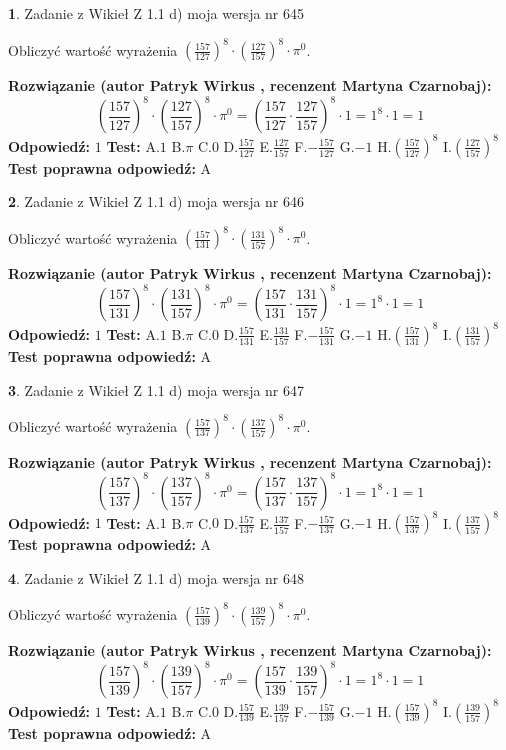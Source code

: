 \documentclass[12pt, a4paper]{article}
\theoremstyle{definition} %
\newtheorem{zad}{}
\newcommand{\zadStart}[1]{\begin{zad}#1\newline}
\newcommand{\zadStop}{\end{zad}}
\newcommand{\rozwStart}[2]{\noindent \textbf{Rozwiązanie (autor #1 , recenzent #2): }\newline}
\newcommand{\rozwStop}{\newline}
\newcommand{\odpStart}{\noindent \textbf{Odpowiedź:}\newline}
\newcommand{\odpStop}{\newline}
\newcommand{\testStart}{\noindent \textbf{Test:}\newline}
\newcommand{\testStop}{\newline}
\newcommand{\kluczStart}{\noindent \textbf{Test poprawna odpowiedź:}\newline}
\newcommand{\kluczStop}{\newline}
\begin{document}
\zadStart{Zadanie z Wikieł Z 1.1 d) moja wersja nr 645}

Obliczyć wartość wyrażenia $(\frac{157}{127})^{8} \cdot (\frac{127}{157})^{8} \cdot \pi^{0}$.
\zadStop
\rozwStart{Patryk Wirkus}{Martyna Czarnobaj}
$$(\frac{157}{127})^{8} \cdot (\frac{127}{157})^{8} \cdot \pi^{0} = (\frac{157}{127} \cdot \frac{127}{157})^{8} \cdot 1 = 1^{8} \cdot 1 = 1$$
\rozwStop
\odpStart
$1$
\odpStop
\testStart
A.$1$ B.$\pi$ C.$0$ D.$\frac{157}{127}$ E.$\frac{127}{157}$
F.$-\frac{157}{127}$ G.$-1$
H.$(\frac{157}{127})^{8}$
I.$(\frac{127}{157})^{8}$
\testStop
\kluczStart
A
\kluczStop



\zadStart{Zadanie z Wikieł Z 1.1 d) moja wersja nr 646}

Obliczyć wartość wyrażenia $(\frac{157}{131})^{8} \cdot (\frac{131}{157})^{8} \cdot \pi^{0}$.
\zadStop
\rozwStart{Patryk Wirkus}{Martyna Czarnobaj}
$$(\frac{157}{131})^{8} \cdot (\frac{131}{157})^{8} \cdot \pi^{0} = (\frac{157}{131} \cdot \frac{131}{157})^{8} \cdot 1 = 1^{8} \cdot 1 = 1$$
\rozwStop
\odpStart
$1$
\odpStop
\testStart
A.$1$ B.$\pi$ C.$0$ D.$\frac{157}{131}$ E.$\frac{131}{157}$
F.$-\frac{157}{131}$ G.$-1$
H.$(\frac{157}{131})^{8}$
I.$(\frac{131}{157})^{8}$
\testStop
\kluczStart
A
\kluczStop



\zadStart{Zadanie z Wikieł Z 1.1 d) moja wersja nr 647}

Obliczyć wartość wyrażenia $(\frac{157}{137})^{8} \cdot (\frac{137}{157})^{8} \cdot \pi^{0}$.
\zadStop
\rozwStart{Patryk Wirkus}{Martyna Czarnobaj}
$$(\frac{157}{137})^{8} \cdot (\frac{137}{157})^{8} \cdot \pi^{0} = (\frac{157}{137} \cdot \frac{137}{157})^{8} \cdot 1 = 1^{8} \cdot 1 = 1$$
\rozwStop
\odpStart
$1$
\odpStop
\testStart
A.$1$ B.$\pi$ C.$0$ D.$\frac{157}{137}$ E.$\frac{137}{157}$
F.$-\frac{157}{137}$ G.$-1$
H.$(\frac{157}{137})^{8}$
I.$(\frac{137}{157})^{8}$
\testStop
\kluczStart
A
\kluczStop



\zadStart{Zadanie z Wikieł Z 1.1 d) moja wersja nr 648}

Obliczyć wartość wyrażenia $(\frac{157}{139})^{8} \cdot (\frac{139}{157})^{8} \cdot \pi^{0}$.
\zadStop
\rozwStart{Patryk Wirkus}{Martyna Czarnobaj}
$$(\frac{157}{139})^{8} \cdot (\frac{139}{157})^{8} \cdot \pi^{0} = (\frac{157}{139} \cdot \frac{139}{157})^{8} \cdot 1 = 1^{8} \cdot 1 = 1$$
\rozwStop
\odpStart
$1$
\odpStop
\testStart
A.$1$ B.$\pi$ C.$0$ D.$\frac{157}{139}$ E.$\frac{139}{157}$
F.$-\frac{157}{139}$ G.$-1$
H.$(\frac{157}{139})^{8}$
I.$(\frac{139}{157})^{8}$
\testStop
\kluczStart
A
\kluczStop
\end{document}
